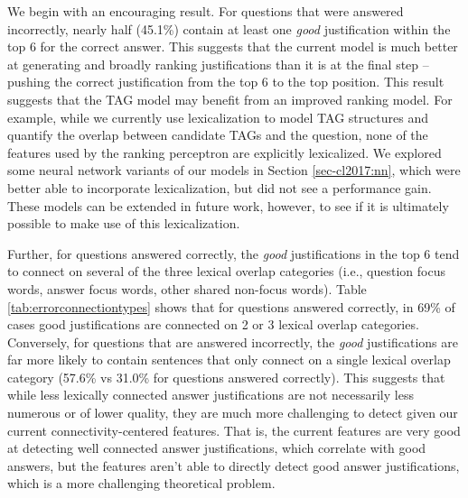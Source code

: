 {}
We begin with an encouraging result. For questions that were answered incorrectly, nearly half (45.1\%) contain at least one \emph{good} justification within the top 6 for the correct answer.  This suggests that the current model is much better at generating and broadly ranking justifications than it is at the final step -- pushing the correct justification from the top 6 to the top position.  This result suggests that the TAG model may benefit from an improved ranking model. For example, while we currently use lexicalization to model TAG structures and quantify the overlap between candidate TAGs and the question, none of the features used by the ranking perceptron are explicitly lexicalized. We explored some neural network variants of our models in Section \ref{sec-cl2017:nn}, which were better able to incorporate lexicalization, but did not see a performance gain.  These models can be extended in future work, however, to see if it is ultimately possible to make use of this lexicalization.


Further, for questions answered correctly, the \emph{good} justifications in the top 6 tend to connect on several of the three lexical overlap categories (i.e., question focus words, answer focus words, other shared non-focus words).  Table \ref{tab:errorconnectiontypes} shows that for questions answered correctly, in 69\% of cases good justifications are connected on 2 or 3 lexical overlap categories.  
Conversely, for questions that are answered incorrectly, the \emph{good} justifications are far more likely to contain sentences that only connect on a single lexical overlap category (57.6\% vs 31.0\% for questions answered correctly). 
This suggests that while less lexically connected answer justifications are not necessarily less numerous or of lower quality, they are much more challenging to detect given our current connectivity-centered features.  That is, the current features are very good at detecting well connected answer justifications, which correlate with good answers, but the features aren't able to directly detect good answer justifications, which is a more challenging theoretical problem.




